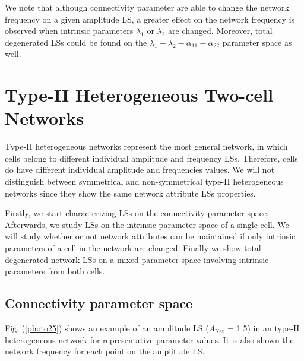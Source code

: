 We note that although connectivity parameter are able to change the network frequency on a given amplitude LS, a greater effect on the network frequency is observed when intrinsic parameters $\lambda_{1}$ or $\lambda_{2}$ are changed. Moreover, total degenerated LSs could be found on the $\lambda_{1}-\lambda_{2}-\alpha_{11}-\alpha_{22}$ parameter space as well.


\section{Type-\textrm{II} Heterogeneous Two-cell Networks}
Type-\textrm{II} heterogeneous networks represent the most general network, in which cells belong to different individual amplitude and frequency LSs. Therefore, cells do have different individual amplitude and frequencies values. We will not distinguish between symmetrical and non-symmetrical type-\textrm{II} heterogeneous networks since they show the same network attribute LSs properties.

Firstly, we start characterizing LSs on the connectivity parameter space. Afterwards, we study LSs on the intrinsic parameter space of a single cell. We will study whether or not network attributes can be maintained if only intrinsic parameters of a cell in the network are changed. Finally we show total-degenerated network LSs on a mixed parameter space involving intrinsic parameters from both cells.

\subsection{Connectivity parameter space}
Fig. (\ref{photo25}) shows an example of an amplitude LS ($A_{\text{Net}}$ = 1.5) in an type-\textrm{II} heterogeneous network for representative parameter values. It is also shown the network frequency for each point on the amplitude LS.

